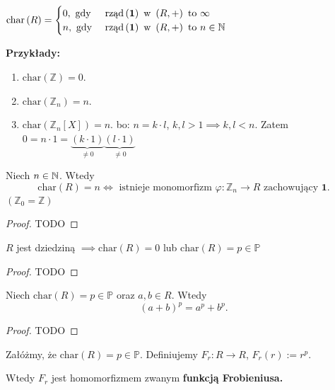 \begin{definition}[Charakterystyka.]
	$\text{char}\left( R \right) = \begin{cases}
		0, \text{ gdy }& \text{rząd}\left( \mathbf{1} \right) \text{ w } \left( R, + \right) \text{ to } \infty \\
                n, \text{ gdy }& \text{rząd}\left( \mathbf{1} \right) \text{ w } \left( R, + \right) \text{ to } n\in \mathbb{N}
	\end{cases}$
\end{definition} 
\noindent \textbf{Przykłady:}
\begin{enumerate}[label=\arabic*)]
	\item $\text{char}\left(\mathbb{Z} \right) = 0$.
	\item $\text{char}\left(\mathbb{Z} _{n} \right) = n$.
	\item $\text{char}\left(\mathbb{Z} _{n} \left[ X \right] \right) = n.$
	bo: $n = k\cdot l$, $k,l > 1 \implies k,l <n$. Zatem $0 = n\cdot 1 = \underbrace{ \left( k\cdot 1 \right) }_{\neq 0} \underbrace{\left( l\cdot 1 \right) }_{\neq 0}$
\end{enumerate}
\begin{fact}

	Niech $n\in \mathbb{N}$. Wtedy
	\[
	\text{char}\left(R\right) = n \iff \text{ istnieje monomorfizm }\varphi :\mathbb{Z} _{n} \to R \text{ zachowujący $\mathbf{1}$}  
	.\] 
	$(\mathbb{Z}_{0} = \mathbb{Z} )$
\end{fact}
\begin{proof}
	TODO
\end{proof} 
\begin{corollary}

	$R$ jest dziedziną $\implies \text{char}\left(R\right) = 0$ lub $\text{char}\left(R\right) = p \in \mathbb{P} $
\end{corollary}
\begin{proof}
	TODO
\end{proof} 
\begin{fact}

	Niech $\text{char}\left(R\right) = p\in \mathbb{P} $ oraz $a,b \in R$. Wtedy
	\[
		\left( a+b \right) ^{p} = a^{p} + b^{p}
	.\] 
\end{fact}
\begin{proof}
	TODO
\end{proof} 
\begin{corollary}

	Załóżmy, że $\text{char}\left(R\right) = p \in \mathbb{P} $. Definiujemy $F_{r}: R \to R$, $F_{r}\left( r \right) := r^{p}$.

	Wtedy $F_{r}$ jest homomorfizmem zwanym \textbf{funkcją Frobieniusa.} 
\end{corollary}
